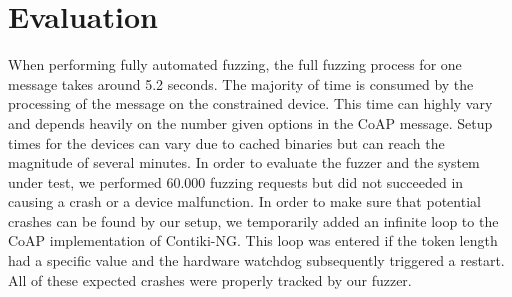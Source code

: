 \section{Evaluation}
\label{section:evaluation}


When performing fully automated fuzzing, the full fuzzing process for one message takes around 5.2 seconds. The majority of time is consumed by the processing of the message on the constrained device. This time can highly vary and depends heavily on the number given options in the CoAP message. Setup times for the devices can vary due to cached binaries but can reach the magnitude of several minutes. In order to evaluate the fuzzer and the system under test, we performed 60.000 fuzzing requests but did not succeeded in causing a crash or a device malfunction. In order to make sure that potential crashes can be found by our setup, we temporarily added an infinite loop to the CoAP implementation of Contiki-NG. This loop was entered if the token length had a specific value and the hardware watchdog subsequently triggered a restart. All of these expected crashes were properly tracked by our fuzzer.